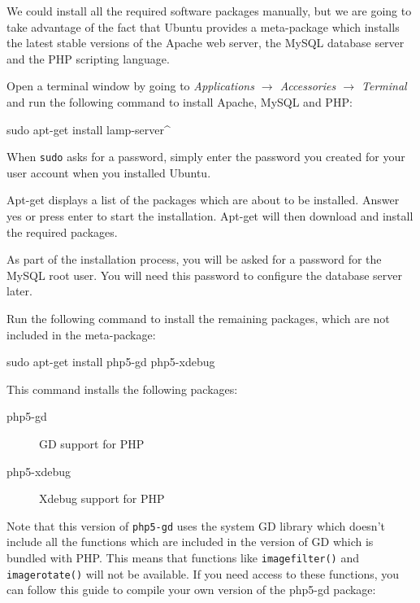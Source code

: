 \documentclass[ebook,10pt,twoside,openright]{memoir}
\begin{document}
We could install all the required software packages manually, but we are going to take advantage of the fact that Ubuntu provides a meta-package which installs the latest stable versions of the Apache web server, the MySQL database server and the PHP scripting language.

Open a terminal window by going to \emph{Applications $\rightarrow$ Accessories $\rightarrow$ Terminal} and run the following command to install Apache, MySQL and PHP:

\begin{squashboxcommand}
sudo apt-get install lamp-server^
\end{squashboxcommand}

When \verb!sudo! asks for a password, simply enter the password you created for your user account when you installed Ubuntu.

Apt-get displays a list of the packages which are about to be installed. Answer yes or press enter to start the installation. Apt-get will then download and install the required packages.
  
As part of the installation process, you will be asked for a password for the MySQL root user. You will need this password to configure the database server later.

Run the following command to install the remaining packages, which are not included in the meta-package:

\begin{squashboxcommand}
sudo apt-get install php5-gd php5-xdebug
\end{squashboxcommand}

This command installs the following packages:

\begin{description}
\item[php5-gd] GD support for PHP
\item[php5-xdebug] Xdebug support for PHP
\end{description}

Note that this version of \verb!php5-gd! uses the system GD library which doesn’t include all the functions which are included in the version of GD which is bundled with PHP. This means that functions like \verb!imagefilter()! and \verb!imagerotate()! will not be available. If you need access to these functions, you can follow this guide to compile your own version of the php5-gd package:

\end{document}
